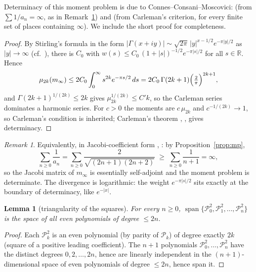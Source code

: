 \documentclass[11pt]{amsart}
\newtheorem{lemma}[theorem]{Lemma}
\theoremstyle{definition}
\theoremstyle{remark}
\newtheorem{remark}[theorem]{Remark}
\newcommand{\bbR}{\mathbb{R}}
\newcommand{\minf}{m_\infty}
\DeclareMathOperator{\spn}{span}
\begin{document}
Determinacy of this moment problem is due to Connes--Consani--Moscovici:
\cite[Thm.~5.2(ii)]{CCMprolate} (from $\sum1/a_n=\infty$, as in
Remark~\ref{rem:jacobicarleman}) and \cite[Prop.~3.1]{CCMq} (from
Carleman's criterion, for every finite set of places containing $\infty$).
We include the short proof for completeness.

\begin{proof}
By Stirling's formula in the form
$|\Gamma(x+iy)|\sim\sqrt{2\pi}\,|y|^{x-1/2}e^{-\pi|y|/2}$ as $|y|\to\infty$
(cf.\ \cite[\S4.42]{Titchmarsh}), there is $C_0$ with
$w(s)\le C_0\,(1+|s|)^{-1/2}e^{-\pi|s|/2}$ for all $s\in\bbR$. Hence
\[
\mu_{2k}(\minf)
\le 2C_0\int_0^{\infty}s^{2k}e^{-\pi s/2}\,ds
=2C_0\,\Gamma(2k+1)\Bigl(\tfrac{2}{\pi}\Bigr)^{2k+1},
\]
and $\Gamma(2k+1)^{1/(2k)}\le2k$ gives $\mu_{2k}^{1/(2k)}\le C'k$, so the
Carleman series dominates a harmonic series. For $c>0$ the moments are
$c\,\mu_{2k}$ and $c^{-1/(2k)}\to1$, so Carleman's condition is inherited;
Carleman's theorem \cite{Carleman}, \cite[Chap.~II]{Akhiezer},
\cite[\S1]{Simon} gives determinacy.
\end{proof}

\begin{remark}\label{rem:jacobicarleman}
Equivalently, in Jacobi-coefficient form
\cite[Chap.~I, Addenda]{Akhiezer}, \cite[\S3]{Simon}: by
Proposition~\ref{prop:mp},
\[
\sum_{n\ge0}\frac1{a_n}
=\sum_{n\ge0}\frac{2}{\sqrt{(2n+1)(2n+2)}}
\;\ge\;\sum_{n\ge0}\frac1{n+1}=\infty,
\]
so the Jacobi matrix of $\minf$ is essentially self-adjoint and the moment
problem is determinate. The divergence is logarithmic: the weight
$e^{-\pi|s|/2}$ sits exactly at the boundary of determinacy, like
$e^{-|x|}$.
\end{remark}

\begin{lemma}[triangularity of the squares]\label{lem:triangular}
For every $n\ge0$,
$\spn\{\mathcal P_0^{2},\mathcal P_1^{2},\dots,\mathcal P_n^{2}\}$ is the
space of all even polynomials of degree $\le2n$.
\end{lemma}

\begin{proof}
Each $\mathcal P_k^{2}$ is an even polynomial (by parity of $\mathcal P_k$)
of degree exactly $2k$ (square of a positive leading coefficient). The $n+1$
polynomials $\mathcal P_0^{2},\dots,\mathcal P_n^{2}$ have the distinct
degrees $0,2,\dots,2n$, hence are linearly independent in the
$(n+1)$-dimensional space of even polynomials of degree $\le2n$, hence span
it.
\end{proof}
\end{document}
